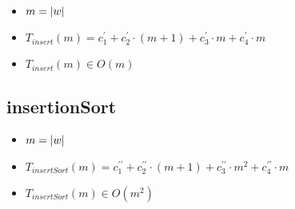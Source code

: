 \documentclass{article}
\begin{document}
    \begin{itemize}
        \item $m = |w|$
        \item $T_{insert}(m) = c^{\prime}_1 +
                               c^{\prime}_2 \cdot (m+1) +
                               c^{\prime}_3 \cdot m +
                               c^{\prime}_4 \cdot m $
        \item $T_{insert}(m) \in O(m)$
    \end{itemize}

    \subsection*{insertionSort}

    \begin{minipage}{0.70\textwidth}
        
    \end{minipage}
    \hfill
    \begin{minipage}{0.25\textwidth}
    \end{minipage}

    \begin{itemize}
        \item $m = |w|$
        \item $T_{insertSort}(m) = c^{\prime\prime}_1 +
                                   c^{\prime\prime}_2 \cdot (m+1) +
                                   c^{\prime\prime}_3 \cdot m^2 +
                                   c^{\prime\prime}_4 \cdot m$
        \item $T_{insertSort}(m) \in O(m^{2})$
    \end{itemize}
\end{document}

